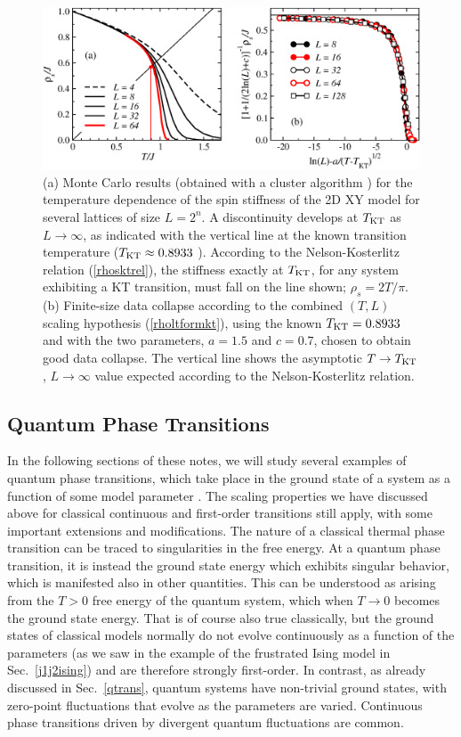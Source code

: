 \documentclass[draft,numberedheadings]{aipproc}
\begin{document}
\begin{figure}
\includegraphics[width=13.5cm, clip]{wxy2d.eps}
\caption{(a) Monte Carlo results (obtained with a cluster algorithm \cite{wolff}) for the temperature dependence of the spin stiffness of the 
2D XY model for several lattices of size $L=2^n$. A discontinuity develops at $T_{\rm KT}$ as $L \to \infty$, as indicated with the vertical line 
at the known transition temperature ($T_{\rm KT}\approx 0.8933$ \cite{tomita02}). According to the Nelson-Kosterlitz relation (\ref{rhosktrel}), 
the stiffness exactly at $T_{\rm KT}$, for any system exhibiting a KT transition, must fall on the line shown; $\rho_s=2T/\pi$. (b) Finite-size 
data collapse according to the combined $(T,L)$ scaling hypothesis (\ref{rholtformkt}), using the known $T_{\rm KT}=0.8933$ and with the two
parameters, $a=1.5$ and $c=0.7$, chosen to obtain good data collapse. The vertical line shows the asymptotic $T\to T_{\rm KT}$, $L\to \infty$ value 
expected according to the Nelson-Kosterlitz relation.} 
\label{wxy2d}
\end{figure}

\subsection{Quantum Phase Transitions}
\label{qcpintro}

In the following sections of these notes, we will study several examples of quantum phase transitions, which take place in the ground state of a system 
as a function of some model parameter \cite{sachdevbook}. The scaling properties we have discussed above for classical continuous and first-order transitions 
still apply, with some important extensions and modifications. The nature of a classical thermal phase transition can be 
traced to singularities in the free energy. At a quantum phase transition, it is instead the ground state energy which exhibits singular behavior, 
which is manifested also in other quantities. This can be understood as arising from the $T>0$ free energy of the quantum system, which when $T \to 0$ 
becomes the ground state energy. That is of course also true classically, but the ground states of classical models normally do not evolve 
continuously as a function of the parameters (as we saw in the example of the frustrated Ising model in Sec.~\ref{j1j2ising}) and are therefore strongly 
first-order. In contrast, as already discussed in Sec.~\ref{qtrans}, quantum systems have non-trivial ground states, with zero-point 
fluctuations that evolve as the parameters are varied. Continuous phase transitions driven by divergent quantum fluctuations are common.
\end{document}

